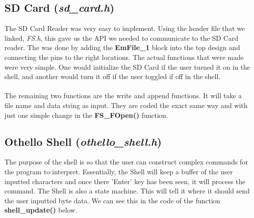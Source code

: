 \documentclass[a4paper, 12pt]{article}
\begin{document}
    \clearpage
    \subsection{SD Card (\textit{sd\_card.h})}

    The SD Card Reader was very easy to implement. Using the header file that
    we linked, \textit{FS.h}, this gave us the API we needed to communicate to
    the SD Card reader. The was done by adding the \textbf{EmFile\_1} block
    into the top design and connecting the pins to the right locations. The
    actual functions that were made were very simple. One would initialize
    the SD Card if the user turned it on in the shell, and another would
    turn it off if the user toggled if off in the shell.
    \\ \\
    The remaining two functions are the write and append functions. It will
    take a file name and data string as input. They are coded the exact same
    way and with just one simple change in the \textbf{FS\_FOpen()} function.

    \subsection{Othello Shell (\textit{othello\_shell.h})}

    The purpose of the shell is so that the user can construct complex commands
    for the program to interpret. Essentially, the Shell will keep a buffer of
    the user inputted characters and once there 'Enter' key has been seen, it
    will process the command. The Shell is also a state machine. This will tell
    it where it should send the user inputted byte data. We can see this in
    the code of the function \textbf{shell\_update()} below.
\end{document}
